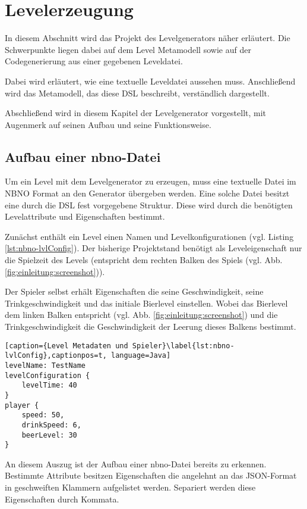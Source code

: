 \section{Levelerzeugung}\label{sec:levelerzeugung}

In diesem Abschnitt wird das Projekt des Levelgenerators näher erläutert. Die Schwerpunkte liegen dabei auf dem Level Metamodell sowie auf der Codegenerierung aus einer gegebenen Leveldatei. 
 
Dabei wird erläutert, wie eine textuelle Leveldatei aussehen muss. Anschließend wird das Metamodell, das diese DSL beschreibt, verständlich dargestellt.

Abschließend wird in diesem Kapitel der Levelgenerator vorgestellt, mit Augenmerk auf seinen Aufbau und seine Funktionsweise.

\subsection{Aufbau einer nbno-Datei}
Um ein Level mit dem Levelgenerator zu erzeugen, muss eine textuelle Datei im NBNO Format an den Generator übergeben werden. Eine solche Datei besitzt eine durch die DSL fest vorgegebene Struktur. Diese wird durch die benötigten Levelattribute und Eigenschaften bestimmt.

Zunächst enthält ein Level einen Namen und Levelkonfigurationen (vgl. Listing \ref{lst:nbno-lvlConfig}). Der bisherige Projektstand benötigt als Leveleigenschaft nur die Spielzeit des Levels (entspricht dem rechten Balken des Spiels (vgl. Abb. \ref{fig:einleitung:screenshot})).

Der Spieler selbst erhält Eigenschaften die seine Geschwindigkeit, seine Trinkgeschwindigkeit und das initiale Bierlevel einstellen. Wobei das Bierlevel dem linken Balken entspricht (vgl. Abb. \ref{fig:einleitung:screenshot}) und die Trinkgeschwindigkeit die Geschwindigkeit der Leerung dieses Balkens bestimmt.

\begin{lstlisting}[caption={Level Metadaten und Spieler}\label{lst:nbno-lvlConfig},captionpos=t, language=Java]
levelName: TestName
levelConfiguration {
    levelTime: 40
}
player {
    speed: 50,
    drinkSpeed: 6,
    beerLevel: 30
}
\end{lstlisting}

An diesem Auszug ist der Aufbau einer nbno-Datei bereits zu erkennen.
Bestimmte Attribute besitzen Eigenschaften die angelehnt an das JSON-Format in geschweiften Klammern aufgelistet werden. Separiert werden diese Eigenschaften durch Kommata.

